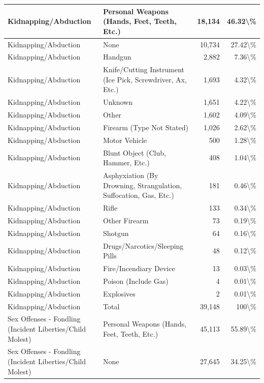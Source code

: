 \documentclass[
]{krantz}
\begin{document}
\begin{longtable}[t]{l|l|r|r}
\hline
Kidnapping/Abduction & Personal Weapons (Hands, Feet, Teeth, Etc.) & 18,134 & 46.32\textbackslash{}\%\\
\hline
Kidnapping/Abduction & None & 10,734 & 27.42\textbackslash{}\%\\
\hline
Kidnapping/Abduction & Handgun & 2,882 & 7.36\textbackslash{}\%\\
\hline
Kidnapping/Abduction & Knife/Cutting Instrument (Ice Pick, Screwdriver, Ax, Etc.) & 1,693 & 4.32\textbackslash{}\%\\
\hline
Kidnapping/Abduction & Unknown & 1,651 & 4.22\textbackslash{}\%\\
\hline
Kidnapping/Abduction & Other & 1,602 & 4.09\textbackslash{}\%\\
\hline
Kidnapping/Abduction & Firearm (Type Not Stated) & 1,026 & 2.62\textbackslash{}\%\\
\hline
Kidnapping/Abduction & Motor Vehicle & 500 & 1.28\textbackslash{}\%\\
\hline
Kidnapping/Abduction & Blunt Object (Club, Hammer, Etc.) & 408 & 1.04\textbackslash{}\%\\
\hline
Kidnapping/Abduction & Asphyxiation (By Drowning, Strangulation, Suffocation, Gas, Etc.) & 181 & 0.46\textbackslash{}\%\\
\hline
Kidnapping/Abduction & Rifle & 133 & 0.34\textbackslash{}\%\\
\hline
Kidnapping/Abduction & Other Firearm & 73 & 0.19\textbackslash{}\%\\
\hline
Kidnapping/Abduction & Shotgun & 64 & 0.16\textbackslash{}\%\\
\hline
Kidnapping/Abduction & Drugs/Narcotics/Sleeping Pills & 48 & 0.12\textbackslash{}\%\\
\hline
Kidnapping/Abduction & Fire/Incendiary Device & 13 & 0.03\textbackslash{}\%\\
\hline
Kidnapping/Abduction & Poison (Include Gas) & 4 & 0.01\textbackslash{}\%\\
\hline
Kidnapping/Abduction & Explosives & 2 & 0.01\textbackslash{}\%\\
\hline
Kidnapping/Abduction & Total & 39,148 & 100\textbackslash{}\%\\
\hline
Sex Offenses - Fondling (Incident Liberties/Child Molest) & Personal Weapons (Hands, Feet, Teeth, Etc.) & 45,113 & 55.89\textbackslash{}\%\\
\hline
Sex Offenses - Fondling (Incident Liberties/Child Molest) & None & 27,645 & 34.25\textbackslash{}\%\\
\hline

\end{longtable}
\end{document}

